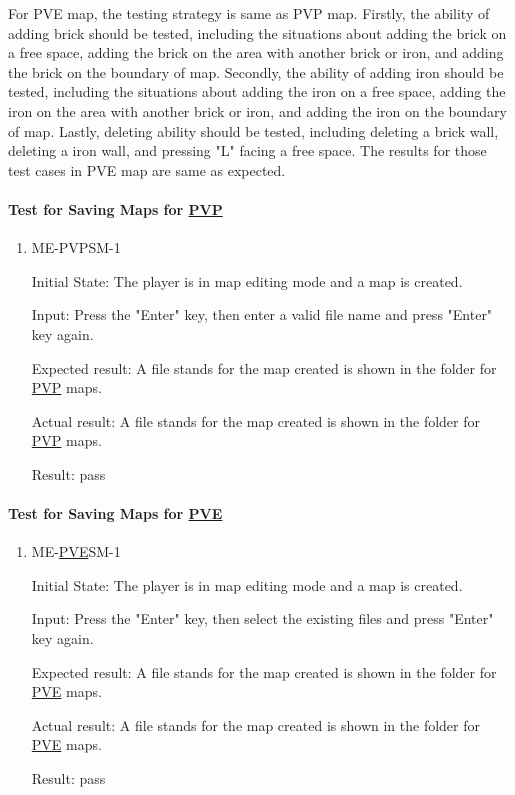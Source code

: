 \documentclass[12pt, titlepage]{article}
\begin{document}
For PVE map, the testing strategy is same as PVP map. Firstly, the ability of adding brick should be tested, including the situations about adding the brick on a free space, adding the brick on the area with another brick or iron, and adding the brick on the boundary of map. Secondly, the ability of adding iron should be tested, including the situations about adding the iron on a free space, adding the iron on the area with another brick or iron, and adding the iron on the boundary of map. Lastly, deleting ability should be tested, including deleting a brick wall, deleting a iron wall, and pressing "L" facing a free space. The results for those test cases in PVE map are same as expected.

\paragraph{Test for Saving Maps for \underline{PVP}}

\begin{enumerate}

\item{ME-PVPSM-1\\}
					
Initial State: The player is in map editing mode and a map is created.
					
Input: Press the "Enter" key, then enter a valid file name and press "Enter" key again.
					
Expected result: A file stands for the map created is shown in the folder for \underline{PVP} maps.
					
Actual result: A file stands for the map created is shown in the folder for \underline{PVP} maps.

Result: pass

\end{enumerate}

\paragraph{Test for Saving Maps for \underline{PVE}}

\begin{enumerate}

\item{ME-\underline{PVE}SM-1\\}
					
Initial State: The player is in map editing mode and a map is created.
					
Input: Press the "Enter" key, then select the existing files and press "Enter" key again.
					
Expected result: A file stands for the map created is shown in the folder for \underline{PVE} maps.
					
Actual result: A file stands for the map created is shown in the folder for \underline{PVE} maps.

Result: pass

\end{enumerate}
\end{document}
